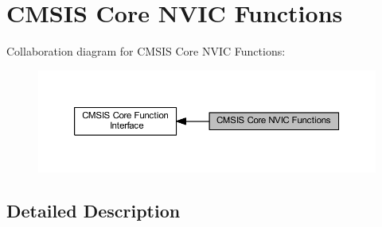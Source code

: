 \hypertarget{group___c_m_s_i_s___core___n_v_i_c_functions}{}\section{C\+M\+S\+IS Core N\+V\+IC Functions}
\label{group___c_m_s_i_s___core___n_v_i_c_functions}
Collaboration diagram for C\+M\+S\+IS Core N\+V\+IC Functions\+:\nopagebreak
\begin{figure}[H]
\begin{center}
\leavevmode
\includegraphics[width=350pt]{group___c_m_s_i_s___core___n_v_i_c_functions}
\end{center}
\end{figure}


\subsection{Detailed Description}
